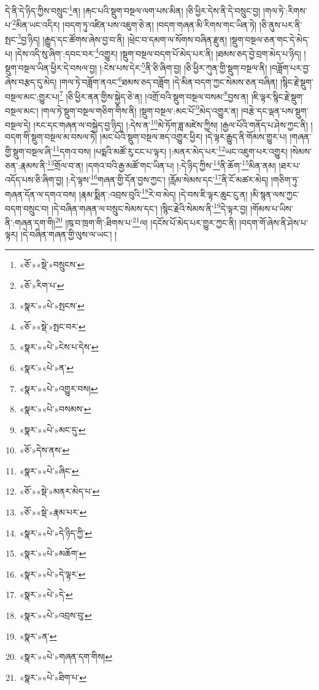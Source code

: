 དེ་ནི་དེ་ཉིད་ཀྱིས་བསྲུང་\footnote{«ཅོ་»«སྡེ་»བསྲུངས་}ན། །རྐང་པའི་སྡུག་བསྔལ་ལག་པས་མིན། །ཅི་ཕྱིར་དེས་ནི་དེ་བསྲུང་བྱ། །གལ་ཏེ་:རིགས་པ་\footnote{«ཅོ་»རིག་པ་}མིན་ཡང་འདིར། །བདག་ཏུ་འཛིན་པས་འཇུག་ཅེ་ན། །བདག་གཞན་མི་རིགས་གང་ཡིན་ཏེ། །ཅི་ནུས་པར་ནི་སྤང་\footnote{«སྣར་»«པེ་»སྤངས་}བྱ་ཉིད། །རྒྱུད་དང་ཚོགས་ཞེས་བྱ་བ་ནི། །ཕྲེང་བ་དམག་ལ་སོགས་བཞིན་རྫུན། །སྡུག་བསྔལ་ཅན་གང་དེ་མེད་པ། །དེས་འདི་སུ་ཞིག་:དབང་བར་\footnote{«ཅོ་»«སྡེ་»སྤང་བར་}འགྱུར། །སྡུག་བསྔལ་བདག་པོ་མེད་པར་ནི། །ཐམས་ཅད་བྱེ་བྲག་མེད་པ་ཉིད། །སྡུག་བསྔལ་ཡིན་ཕྱིར་དེ་བསལ་བྱ། །:ངེས་པས་དེར་\footnote{«སྣར་»«པེ་»ངེས་པ་དེས་}ནི་ཅི་ཞིག་བྱ། །ཅི་ཕྱིར་ཀུན་གྱི་སྡུག་བསྔལ་ནི། །བཟློག་པར་བྱ་ཞེས་བརྩད་དུ་མེད། །གལ་ཏེ་བཟློག་ནའང་\footnote{«སྣར་»«པེ་»ན་}ཐམས་ཅད་བཟློག །དེ་མིན་བདག་ཀྱང་སེམས་ཅན་བཞིན། །སྙིང་རྗེ་སྡུག་བསྔལ་མང་:གྱུར་པ།\footnote{«སྣར་»«པེ་»འགྱུར་བས།} །ཅི་ཕྱིར་ནན་གྱིས་སྐྱེད་ཅེ་ན། །འགྲོ་བའི་སྡུག་བསྔལ་བསམ་\footnote{«སྣར་»«པེ་»བསམས་}བྱས་ན། །ཇི་ལྟར་སྙིང་རྗེ་སྡུག་བསྔལ་མང་། །གལ་ཏེ་སྡུག་བསྔལ་གཅིག་གིས་ནི། །སྡུག་བསྔལ་:མང་པོ་\footnote{«སྣར་»«པེ་»མང་དུ་}མེད་འགྱུར་ན། །བརྩེ་དང་ལྡན་པས་སྡུག་བསྔལ་དེ། །རང་དང་གཞན་ལ་བསྐྱེད་བྱ་ཉིད། །:དེས་ན་\footnote{«ཅོ་»དེས་ནས་}མེ་ཏོག་ཟླ་མཛེས་ཀྱིས། །རྒྱལ་པོའི་གནོད་པ་ཤེས་ཀྱང་ནི། །བདག་གི་སྡུག་བསྔལ་མ་བསལ་ཏེ། །མང་པོའི་སྡུག་བསྔལ་ཟད་འགྱུར་ཕྱིར། །དེ་ལྟར་རྒྱུད་ནི་གོམས་གྱུར་པ། །གཞན་གྱི་སྡུག་བསྔལ་ཞི་\footnote{«སྣར་»«པེ་»ཞིང་}དགའ་བས། །པདྨའི་མཚོ་རུ་ངང་པ་ལྟར། །:མནར་མེད་པར་\footnote{«ཅོ་»«སྡེ་»མནར་མེད་པ་}ཡང་འཇུག་པར་འགྱུར། །སེམས་ཅན་:རྣམས་ནི་\footnote{«ཅོ་»«སྡེ་»རྣམ་པར་}གྲོལ་བ་ན། །དགའ་བའི་རྒྱ་མཚོ་གང་ཡིན་པ། །:དེ་ཉིད་ཀྱིས་\footnote{«སྣར་»«པེ་»དེ་ཉིད་ཀྱི་}ནི་ཆོག་\footnote{«སྣར་»«པེ་»མཆོག་}མིན་ནམ། །ཐར་པ་འདོད་པས་ཅི་ཞིག་བྱ། །:དེ་ལྟས་\footnote{«སྣར་»«པེ་»དེ་ལྟར་}གཞན་གྱི་དོན་བྱས་ཀྱང་། །རློམ་སེམས་དང་\footnote{«སྣར་»«པེ་»དེ་}ནི་ངོ་མཚར་མེད། །གཅིག་ཏུ་གཞན་དོན་ལ་དགའ་བས། །རྣམ་སྨིན་:འབྲས་བུའི་\footnote{«སྣར་»«པེ་»འབྲས་བུ་}རེ་བ་མེད། །དེ་བས་ཇི་ལྟར་ཆུང་ངུ་ན། །མི་སྙན་ལས་ཀྱང་བདག་བསྲུང་བ། །དེ་བཞིན་གཞན་ལ་བསྲུང་སེམས་དང་། །སྙིང་རྗེའི་སེམས་ནི་\footnote{«སྣར་»ན་}དེ་ལྟར་བྱ། །གོམས་པ་ཡིས་ནི་:གཞན་དག་གི།\footnote{«སྣར་»«པེ་»གཞན་དག་གིས།} །ཁུ་བ་ཁྲག་གི་:ཐིགས་པ་\footnote{«སྣར་»«པེ་»ཐིག་པ་}ལ། །དངོས་པོ་མེད་པར་གྱུར་ཀྱང་ནི། །བདག་གོ་ཞེས་ནི་ཤེས་པ་ལྟར། །དེ་བཞིན་གཞན་གྱི་ལུས་ལ་ཡང་། །
